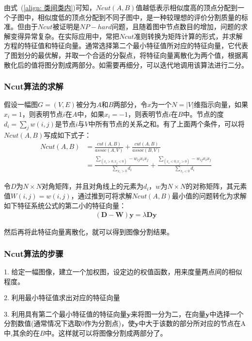 \documentclass[12pt]{article}
\begin{document}
由式~(\ref{align: 类间类内})可知，$Ncut(A, B)$值越低表示相似度高的顶点分配到一个子图中，相似度低的顶点分配到不同子图中，是一种较理想的评价分割质量的标准。但由于$Ncut$被证明是$NP-hard$问题，且随着图中节点数目的增加，问题的求解变得异常复杂。在实际应用中，常把$Ncut$准则转换为矩阵计算的形式，并求解方程的特征值和特征向量。通常选择第二个最小特征值所对应的特征向量，它代表了图划分的最优解，并取一个合适的分裂点，将特征向量离散化为两个值，根据离散化后的值将图分割成两部分。如需要再细分，可以迭代地调用该算法进行二分。

\subsubsection{Ncut算法的求解}

假设一幅图$G = (V, E)$被分为$A$和$B$两部分，令$x$为一个$N = |V|$维指示向量，如果$x_i = 1$，则表明节点$i$在$A$中，如果$x_i= -1$，则表明节点$i$在$B$中。节点的度$d_i = \sum_j w(i, j)$是节点$i$与$V$中所有节点的关系之和。有了上面两个条件，可以将$Ncut(A, B)$写成如下式子：
\begin{align}
Ncut(A, B) & = \frac{cut(A, B)}{assoc(A, V)} + \frac{cut(A, B)}{assoc(B, V)} \nonumber \\
& = \frac{\sum_{(x_i>0, x_j<0)} -w_{ij}x_i x_j}{\sum_{x_i>0}d_i} + \frac{\sum_{(x_i<0, x_j>0)} -w_{ij}x_i x_j}{\sum_{x_i<0}d_i}
\end{align}

令$D$为$N \times N$对角矩阵，并且对角线上的元素为$d_i$，$w$为$N \times N$的对称矩阵，其元素值$W(i, j) = w(i, j)$，通过推到可将求解$Ncut(A, B)$最小值的问题转化为求解如下特征系统公式的第二小的特征向量：
\begin{align}
(\mathbf{D} - \mathbf{W})\mathbf{y} = \lambda \mathbf{Dy}
\end{align}

然后再将此特征向量离散化，就可以得到图像分割结果。

\subsubsection{Ncut算法的步骤}

1. 给定一幅图像，建立一个加权图，设定边的权值函数，用来度量两点间的相似程度。

2. 利用最小特征值求出对应的特征向量

3. 利用具有第二个最小特征值的特征向量$\mathbf{y}$来将图一分为二，在向量$\mathbf{y}$中选择一个分割数值(通常情况下选取0作为分割点)，使$\mathbf{y}$中大于该数的部分所对应的节点在A中,其余的在$B$中。这样就可以将图像分割成两部分了。
\end{document}
